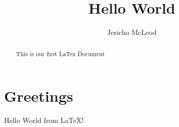 \documentclass[11pt]{article}
\title{Hello World}
\author{Jericho McLeod}
\begin{document}
\maketitle

\begin{abstract}
This is our first LaTex Document
\end{abstract}

\section{Greetings}
Hello World from \LaTeX! 
\end{document}

